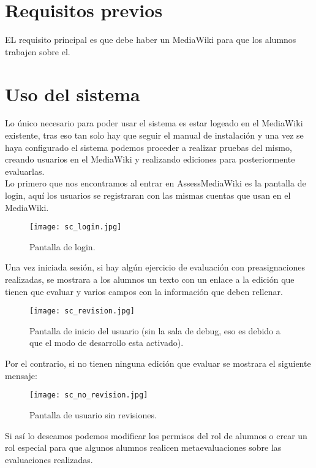 \section{Requisitos previos}
EL requisito principal es que debe haber un MediaWiki para que los alumnos trabajen sobre el.

\section{Uso del sistema}
Lo único necesario para poder usar el sistema es estar logeado en el MediaWiki existente, tras eso tan solo hay que seguir el manual de instalación y una vez se haya configurado el sistema podemos proceder a realizar pruebas del mismo, creando usuarios en el MediaWiki y realizando ediciones para posteriormente evaluarlas.\\

Lo primero que nos encontramos al entrar en AssessMediaWiki es la pantalla de login, aquí los usuarios se registraran con las mismas cuentas que usan en el MediaWiki.\\

\begin{figure}[h!]
	\centering
	\texttt{[image: sc\_login.jpg]}
	\caption{Pantalla de login.}
\end{figure}
\clearpage

Una vez iniciada sesión, si hay algún ejercicio de evaluación con preasignaciones realizadas, se mostrara a los alumnos un texto con un enlace a la edición que tienen que evaluar y varios campos con la información que deben rellenar.\\

\begin{figure}[h!]
	\centering
	\texttt{[image: sc\_revision.jpg]}
	\caption{Pantalla de inicio del usuario (sin la sala de debug, eso es debido a que el modo de desarrollo esta activado).}
\end{figure}
\clearpage

Por el contrario, si no tienen ninguna edición que evaluar se mostrara el siguiente mensaje:\\

\begin{figure}[h!]
	\centering
	\texttt{[image: sc\_no\_revision.jpg]}
	\caption{Pantalla de usuario sin revisiones.}
\end{figure}
\clearpage

Si así lo deseamos podemos modificar los permisos del rol de alumnos o crear un rol especial para que algunos alumnos realicen metaevaluaciones sobre las evaluaciones realizadas.\\

